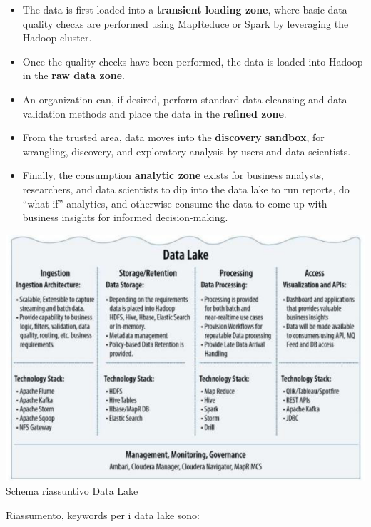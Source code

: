 \documentclass[a4page, 11pt]{article}
\begin{document}
\begin{itemize}
\item The data is first loaded into a \textbf{transient loading zone}, where basic data quality checks are performed using MapReduce or Spark by leveraging the Hadoop cluster. 
\item Once the quality checks have been performed, the data is loaded into Hadoop in the \textbf{raw data zone}.

\item An organization can, if desired, perform standard data cleansing and data validation methods and place the data in the \textbf{refined zone}. 

\item From the trusted area, data moves into the \textbf{discovery sandbox}, for wrangling, discovery, and exploratory analysis by users and data scientists.

\item Finally, the consumption \textbf{analytic zone} exists for business analysts, researchers, and data scientists to dip into the data lake to run reports, do “what if” analytics, and otherwise consume the data to come up with business insights for informed decision-making.

\end{itemize}

\begin{center}
\includegraphics[scale=0.70]{IMAGE10.png}\\
Schema riassuntivo Data Lake
\end{center}

Riassumento, keywords per i data lake sono:
\end{document}
